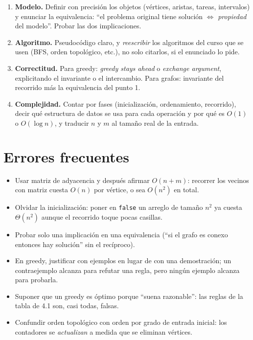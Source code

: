 \documentclass[11pt,a4paper]{article}
\theoremstyle{plain}
\theoremstyle{definition}
\theoremstyle{remark}
\begin{document}
\begin{enumerate}[label=\textbf{\arabic*.}]
\item \textbf{Modelo.} Definir con precisión los objetos (vértices, aristas, tareas,
intervalos) y enunciar la equivalencia: ``el problema original tiene solución
$\iff$ \emph{propiedad} del modelo''. Probar las dos implicaciones.
\item \textbf{Algoritmo.} Pseudocódigo claro, y \emph{reescribir} los algoritmos del
curso que se usen (BFS, orden topológico, etc.), no solo citarlos, si el enunciado lo
pide.
\item \textbf{Correctitud.} Para greedy: \emph{greedy stays ahead} o \emph{exchange
argument}, explicitando el invariante o el intercambio. Para grafos: invariante del
recorrido más la equivalencia del punto 1.
\item \textbf{Complejidad.} Contar por fases (inicialización, ordenamiento, recorrido),
decir qué estructura de datos se usa para cada operación y por qué es $O(1)$ o
$O(\log n)$, y traducir $n$ y $m$ al tamaño real de la entrada.
\end{enumerate}

\section{Errores frecuentes}

\begin{itemize}
\item Usar matriz de adyacencia y después afirmar $O(n+m)$: recorrer los vecinos con
matriz cuesta $O(n)$ por vértice, o sea $O(n^2)$ en total.
\item Olvidar la inicialización: poner en \texttt{false} un arreglo de tamaño $n^2$ ya
cuesta $\Theta(n^2)$ aunque el recorrido toque pocas casillas.
\item Probar solo una implicación en una equivalencia (``si el grafo es conexo entonces
hay solución'' sin el recíproco).
\item En greedy, justificar con ejemplos en lugar de con una demostración; un
contraejemplo alcanza para refutar una regla, pero ningún ejemplo alcanza para
probarla.
\item Suponer que un greedy es óptimo porque ``suena razonable'': las reglas de la
tabla de 4.1 son, casi todas, falsas.
\item Confundir orden topológico con orden por grado de entrada inicial: los contadores
se \emph{actualizan} a medida que se eliminan vértices.
\end{itemize}
\end{document}
